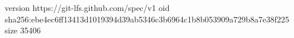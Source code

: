 version https://git-lfs.github.com/spec/v1
oid sha256:ebe4ec6ff13413d1019394d39ab5346c3b6964c1b8b053909a729b8a7e38f225
size 35406
